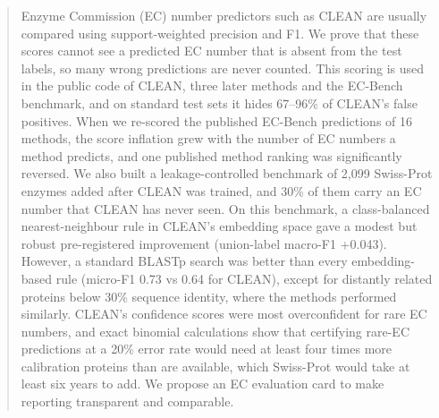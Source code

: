 \documentclass[a4paper,fleqn]{cas-sc}
\begin{document}
\let\WriteBookmarks\relax
\def\floatpagepagefraction{1}
\def\textpagefraction{.001}

\shorttitle{}


\title [mode = title]{}


\author[1]{Prativa Khanal}

\cormark[1]


\credit{}




\begin{abstract}
Enzyme Commission (EC) number predictors such as CLEAN are usually compared using support-weighted precision and F1. We prove that these scores cannot see a predicted EC number that is absent from the test labels, so many wrong predictions are never counted. This scoring is used in the public code of CLEAN, three later methods and the EC-Bench benchmark, and on standard test sets it hides 67--96\% of CLEAN's false positives. When we re-scored the published EC-Bench predictions of 16 methods, the score inflation grew with the number of EC numbers a method predicts, and one published method ranking was significantly reversed. We also built a leakage-controlled benchmark of 2,099 Swiss-Prot enzymes added after CLEAN was trained, and 30\% of them carry an EC number that CLEAN has never seen. On this benchmark, a class-balanced nearest-neighbour rule in CLEAN's embedding space gave a modest but robust pre-registered improvement (union-label macro-F1 +0.043). However, a standard BLASTp search was better than every embedding-based rule (micro-F1 0.73 vs 0.64 for CLEAN), except for distantly related proteins below 30\% sequence identity, where the methods performed similarly. CLEAN's confidence scores were most overconfident for rare EC numbers, and exact binomial calculations show that certifying rare-EC predictions at a 20\% error rate would need at least four times more calibration proteins than are available, which Swiss-Prot would take at least six years to add. We propose an EC evaluation card to make reporting transparent and comparable.
\end{abstract}
\end{document}
